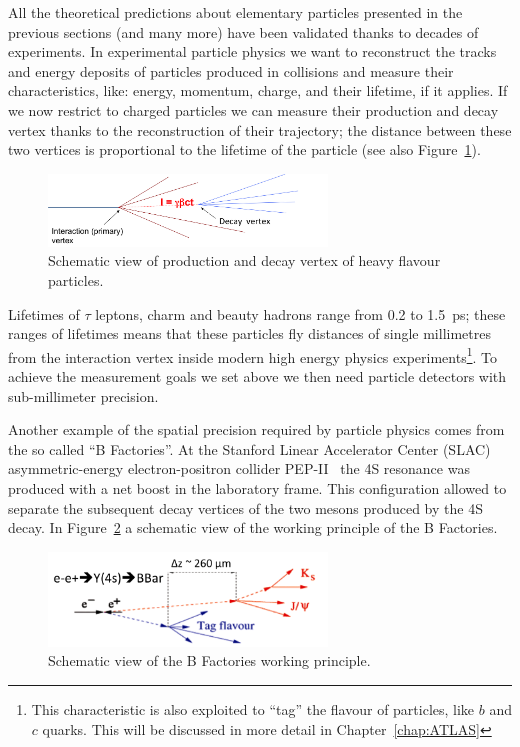 All the theoretical predictions about elementary particles presented in the previous sections 
(and many more) 
have been validated thanks to decades of experiments. In experimental particle physics we 
want to 
reconstruct the tracks and energy deposits of particles produced in collisions and measure their 
characteristics, like: energy, momentum, charge, and their lifetime, if it applies.
If we now restrict to charged particles we can measure their production and decay vertex thanks to 
the reconstruction of their trajectory; the distance between these two vertices is proportional to the 
lifetime of the particle (see also Figure~\ref{fig:HFDV}).

\begin{figure}[htbp]
   \centering
   \includegraphics[width=0.66\textwidth]{lifetime.png} %
   \caption{Schematic view of production and decay vertex of heavy flavour particles.}
   \label{fig:HFDV}
\end{figure}

Lifetimes of $\tau$ leptons, charm 
and beauty hadrons range from 0.2 to 1.5~ps; these ranges of lifetimes means that these particles 
fly distances of single millimetres from the interaction vertex inside modern high energy physics 
experiments\footnote{This characteristic is also exploited to ``tag'' the flavour of particles, like $b$ and 
$c$ quarks. This will be discussed in more detail in Chapter~\ref{chap:ATLAS}}. To achieve the measurement goals we set above we then need particle detectors
with sub-millimeter precision.

Another example of the spatial precision required by particle physics comes from the 
so called ``B Factories''. At the Stanford Linear Accelerator Center (SLAC) 
asymmetric-energy electron-positron collider PEP-II~\cite{37821} the \Y4S resonance was produced 
with a net boost in the laboratory frame. This configuration allowed to separate the subsequent 
decay vertices of the two \B mesons produced by the \Y4S decay. In Figure~\ref{fig:BFCPV} 
a schematic view of the working principle of the B Factories. 

\begin{figure}[htbp]
   \centering
   \includegraphics[width=0.66\textwidth]{BFCPV.png} %
   \caption{Schematic view of the B Factories working principle.}
   \label{fig:BFCPV}
\end{figure}

